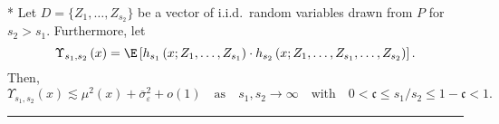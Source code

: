 \newpage
\begin{lem}\label{lem:upsilon_s}\mbox{}\\*
	Let $D = \{Z_1, \dotsc, Z_{s_2}\}$ be a vector of i.i.d.\ random variables drawn from $P$ for $s_2 > s_1$.
	Furthermore, let
	\begin{equation}
		\Upsilon_{s_1, s_2}\left(x\right)
		= \E\left[h_{s_1}\left(x; Z_1, \ldots,  Z_{s_1}\right) \cdot
			h_{s_2}\left(x; Z_1, \ldots,Z_{s_1}, \ldots, Z_{s_2}\right)\right].
	\end{equation}
	Then,
	\begin{equation}
		\Upsilon_{s_1, s_2}\left(x\right)
		\lesssim \mu^{2}\left(x\right) + \overline{\sigma}^2_{\varepsilon} + o(1)
		\quad \text{as} \quad s_1, s_2 \rightarrow \infty
		\quad \text{with} \quad
		0 < \mathfrak{c} \leq s_1 / s_2 \leq 1 - \mathfrak{c} < 1.
	\end{equation}
\end{lem}
\hrule
